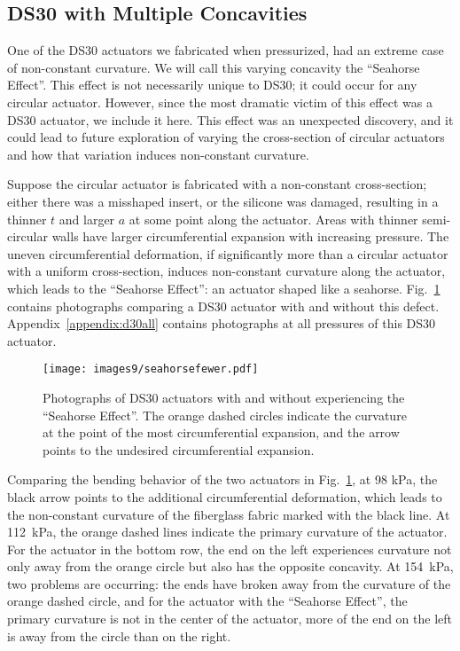 \clearpage
\subsection{DS30 with Multiple Concavities}

One of the DS30 actuators we fabricated when pressurized, had an extreme case of non-constant curvature. We will call this varying concavity the ``Seahorse Effect''. This effect is not necessarily unique to DS30; it could occur for any circular actuator. However, since the most dramatic victim of this effect was a DS30 actuator, we include it here. This effect was an unexpected discovery, and it could lead to future exploration of varying the cross-section of circular actuators and how that variation induces non-constant curvature. 

Suppose the circular actuator is fabricated with a non-constant cross-section; either there was a misshaped insert, or the silicone was damaged, resulting in a thinner $t$ and larger $a$ at some point along the actuator. Areas with thinner semi-circular walls have larger circumferential expansion with increasing pressure. The uneven circumferential deformation, if significantly more than a circular actuator with a uniform cross-section, induces non-constant curvature along the actuator, which leads to the ``Seahorse Effect'': an actuator shaped like a seahorse. Fig.~\ref{fig:seahorsefewer} contains photographs comparing a DS30 actuator with and without this defect. Appendix~\ref{appendix:d30all} contains photographs at all pressures of this DS30 actuator. 

\begin{figure}[!ht]
    \centering
     \texttt{[image: images9/seahorsefewer.pdf]}
    \caption{Photographs of DS30 actuators with and without experiencing the ``Seahorse Effect''. The orange dashed circles indicate the curvature at the point of the most circumferential expansion, and the arrow points to the undesired circumferential expansion.}
    \label{fig:seahorsefewer}
\end{figure}

Comparing the bending behavior of the two actuators in Fig.~\ref{fig:seahorsefewer}, at 98 kPa, the black arrow points to the additional circumferential deformation, which leads to the non-constant curvature of the fiberglass fabric marked with the black line. At 112~kPa, the orange dashed lines indicate the primary curvature of the actuator. For the actuator in the bottom row, the end on the left experiences curvature not only away from the orange circle but also has the opposite concavity. At 154~kPa, two problems are occurring: the ends have broken away from the curvature of the orange dashed circle, and for the actuator with the ``Seahorse Effect'', the primary curvature is not in the center of the actuator, more of the end on the left is away from the circle than on the right. 

